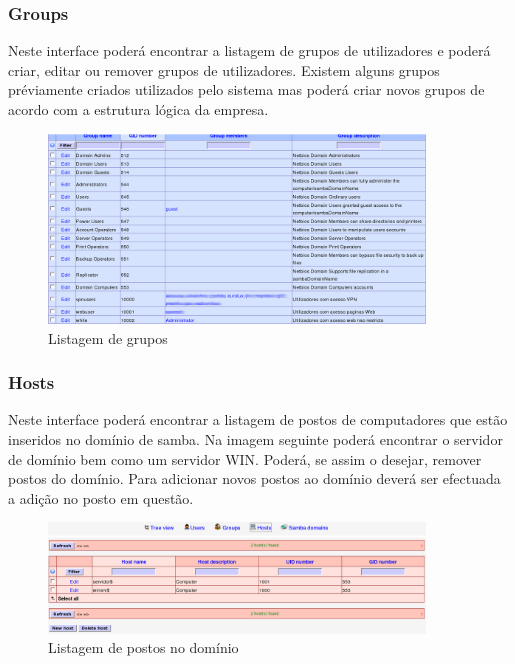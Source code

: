 \subsubsection{Groups}

Neste interface poderá encontrar a listagem de grupos de utilizadores e poderá criar, editar ou remover grupos de utilizadores. Existem alguns grupos préviamente criados utilizados pelo sistema mas poderá criar novos grupos de acordo com a estrutura lógica da empresa.

\begin{figure}[H]
    \begin{center}
        \includegraphics[width=10cm]{include/img/lam6}
    \end{center}
    \caption{Listagem de grupos}
    \label{fig:LAM6}
\end{figure}

\subsubsection{Hosts}

Neste interface poderá encontrar a listagem de postos de computadores que estão inseridos no domínio de samba. Na imagem seguinte poderá encontrar o servidor de domínio bem como um servidor WIN. Poderá, se assim o desejar, remover postos do domínio. Para adicionar novos postos ao domínio deverá ser efectuada a adição no posto em questão.

\begin{figure}[H]
    \begin{center}
        \includegraphics[width=10cm]{include/img/lam7}
    \end{center}
    \caption{Listagem de postos no domínio}
    \label{fig:LAM7}
\end{figure}


